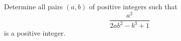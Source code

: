 Determine all pairs $(a,b)$ of positive integers such that
\[ \frac{a^2}{2ab^2 - b^3 + 1} \]
is a positive integer.
